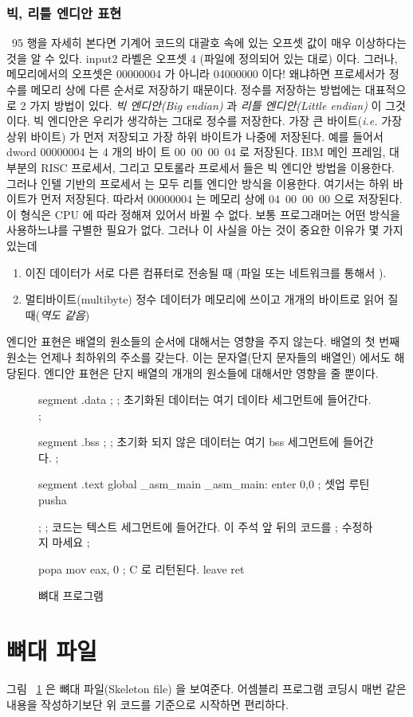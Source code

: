 
\subsubsection{빅, 리틀 엔디안 표현 }
~95 행을 자세히 본다면 기계어 코드의 대괄호 속에 있는 오프셋 값이 매우 이상하다는 것을 알 수 있다. {\code input2} 라벨은 오프셋 4 (파일에 정의되어 있는 대로)
이다. 그러나, 메모리에서의 오프셋은 00000004 가 아니라 04000000 이다! 왜냐하면 프로세서가 정수를 메모리 상에 다른 순서로 저장하기 때문이다. 정수를 저장하는
방법에는 대표적으로 2 가지 방법이 있다. \emph{빅 엔디안(Big endian)} 과 \emph{리틀 엔디안(Little endian)} 이 그것이다. 빅 엔디안은 우리가 생각하는 그대로
정수를 저장한다. 가장 큰 바이트(\emph{i.e.} 가장 상위 바이트) 가 먼저 저장되고 가장 하위 바이트가 나중에 저장된다. 예를 들어서 dword 00000004 는 4 개의 바이
트 00~00~00~04 로 저장된다. IBM 메인 프레임, 대부분의 RISC 프로세서, 그리고 모토롤라 프로세서 들은 빅 엔디안 방법을 이용한다. 그러나 인텔 기반의 프로세서
는 모두 리틀 엔디안 방식을 이용한다. 여기서는 하위 바이트가 먼저 저장된다. 따라서 00000004 는 메모리 상에 04~00~00~00 으로 저장된다. 이 형식은 CPU
에 따라 정해져 있어서 바뀔 수 없다. 보통 프로그래머는 어떤 방식을 사용하느냐를 구별한 필요가 없다. 그러나 이 사실을 아는 것이 중요한 이유가 몇 가지 있는데

\begin{enumerate}
\item 이진 데이터가 서로 다른 컴퓨터로 전송될 때 (파일 또는
      네트워크를 통해서 ).
\item 멀티바이트(multibyte) 정수 데이터가 메모리에 쓰이고  
      개개의 바이트로 읽어 질 때(\emph{역도 같음})
\end{enumerate}

엔디안 표현은 배열의 원소들의 순서에 대해서는 영향을 주지 않는다. 배열의 첫 번째 원소는 언제나 최하위의 주소를 갖는다. 이는 문자열(단지 문자들의 배열인)
에서도 해당된다. 엔디안 표현은 단지 배열의 개개의 원소들에 대해서만 영향을 줄 뿐이다. 

\begin{figure}[t]
\begin{AsmCodeListing}[label=skel.asm]
segment .data
;
; 초기화된 데이터는 여기 데이타 세그먼트에 들어간다. 
;

segment .bss
;
; 초기화 되지 않은 데이터는 여기 bss 세그먼트에 들어간다. 
;

segment .text
        global  _asm_main
_asm_main:
        enter   0,0               ; 셋업 루틴
        pusha

;
; 코드는 텍스트 세그먼트에 들어간다. 이 주석 앞 뒤의 코드를
; 수정하지 마세요 
;

        popa
        mov     eax, 0            ; C 로 리턴된다. 
        leave                     
        ret
\end{AsmCodeListing}
\caption{뼈대 프로그램\label{fig:skel}}
\end{figure}

\section{뼈대 파일 }

그림 ~\ref{fig:skel} 은 뼈대 파일(Skeleton file) 을 보여준다. 어셈블리 프로그램 코딩시 매번 같은 내용을 작성하기보단 위 코드를 기준으로 시작하면
편리하다. 






